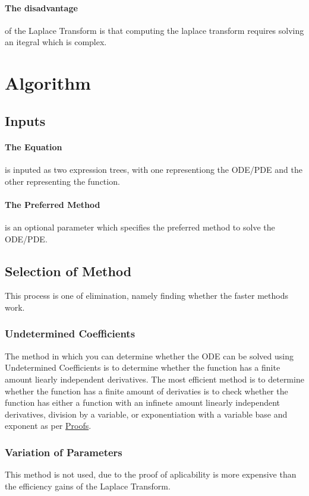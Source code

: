 \documentclass{article}
\begin{document}
\paragraph{The disadvantage} of the Laplace Transform is that computing the laplace transform requires solving an itegral which is complex.

\section{Algorithm}
\subsection{Inputs}
\paragraph{The Equation} is inputed as two expression trees, with one representiong the ODE/PDE and the other representing the function.
\paragraph{The Preferred Method} is an optional parameter which specifies the preferred method to solve the ODE/PDE.
\subsection{Selection of Method}
This process is one of elimination, namely finding whether the faster methods work.
\subsubsection{Undetermined Coefficients}
The method in which you can determine whether the ODE can be solved using Undetermined Coefficients is to determine whether the function has a finite amount liearly independent derivatives.
The most efficient method is to determine whether the function has a finite amount of derivaties is to check whether the function has either a function with an infinete amount linearly independent derivatives, division by a variable, or exponentiation with a variable base and exponent
as per \hyperref[sec:derivative_proofs]{Proofs}.
\subsubsection{Variation of Parameters}
This method is not used, due to the proof of aplicability is more expensive than the efficiency gains of the Laplace Transform.
\end{document}
